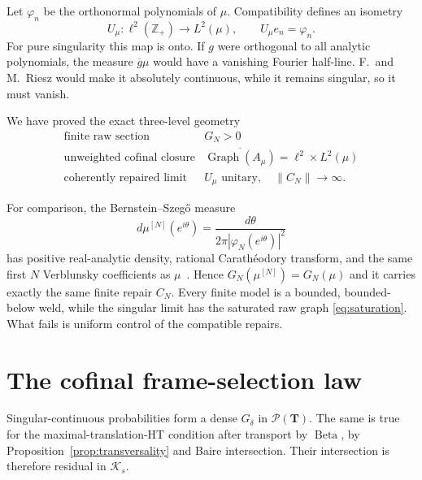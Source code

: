 \documentclass[11pt]{article}
\newcommand{\cK}{\mathcal K}
\newcommand{\cP}{\mathcal P}
\newcommand{\Graph}{\operatorname{Graph}}
\newcommand{\Beta}{\operatorname{Beta}}
\begin{document}
Let $\varphi_n$ be the orthonormal polynomials of $\mu$.  Compatibility defines an isometry
\begin{equation}\label{eq:unitary-map}
  U_\mu:\ell^2(\mathbb Z_+)\longrightarrow L^2(\mu),
  \qquad U_\mu e_n=\varphi_n.
\end{equation}
For pure singularity this map is onto.  If $g$ were orthogonal to all analytic polynomials, the
measure $\overline g\mu$ would have a vanishing Fourier half-line.  F.~and M.~Riesz would make it
absolutely continuous, while it remains singular, so it must vanish.

We have proved the exact three-level geometry
\begin{equation}\label{eq:trichotomy}
\begin{array}{c|c}
\text{finite raw section}&G_N>0\\
\text{unweighted cofinal closure}&\overline{\Graph(A_\mu)}
  =\ell^2\times L^2(\mu)\\
\text{coherently repaired limit}&U_\mu\text{ unitary},\quad \|C_N\|\to\infty.
\end{array}
\end{equation}

For comparison, the Bernstein--Szeg\H{o} measure
\begin{equation}\label{eq:bs}
  d\mu^{[N]}(e^{i\theta})=
  \frac{d\theta}{2\pi|\varphi_N(e^{i\theta})|^2}
\end{equation}
has positive real-analytic density, rational Carath\'eodory transform, and the same first $N$
Verblunsky coefficients as $\mu$~\cite{Simon2005}.  Hence
$G_N(\mu^{[N]})=G_N(\mu)$ and it carries exactly the same finite repair $C_N$.
Every finite model is a bounded, bounded-below weld, while the singular limit has the saturated
raw graph \eqref{eq:saturation}.  What fails is uniform control of the compatible repairs.

\section{The cofinal frame-selection law}\label{sec:combined}

Singular-continuous probabilities form a dense $G_\delta$ in $\cP(\mathbf T)$.  The same is true
for the maximal-translation-HT condition after transport by $\Beta$, by
Proposition~\ref{prop:transversality} and Baire intersection.  Their intersection is therefore
residual in $\cK_s$.
\end{document}
